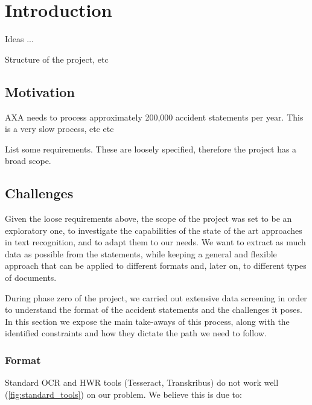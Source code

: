 
\chapter{Introduction} %

\label{ch:intro}


Ideas ...

Structure of the project, etc


\section{Motivation}
AXA needs to process approximately 200,000 accident statements per year. This is a very slow process, etc etc

List some requirements. These are loosely specified, therefore the project has a broad scope.

\section{Challenges}\label{sec:challenges}
Given the loose requirements above, the scope of the project was set to be an exploratory one, to investigate the capabilities of the state of the art approaches in text recognition, and to adapt them to our needs. We want to extract as much data as possible from the statements, while keeping a general and flexible approach that can be applied to different formats and, later on, to different types of documents.

During phase zero of the project, we carried out extensive data screening in order to understand the format of the accident statements and the challenges it poses. In this section we expose the main take-aways of this process, along with the identified constraints and how they dictate the path we need to follow.


\subsection{Format}
Standard OCR and HWR tools (Tesseract, Transkribus) do not work well (\autoref{fig:standard_tools}) on our problem. We believe this is due to:

